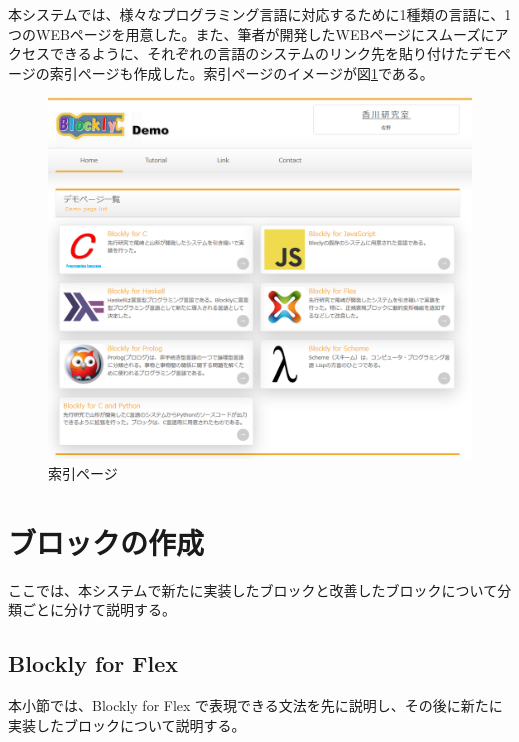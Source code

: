 \documentclass{risepaper}
\begin{document}
本システムでは、様々なプログラミング言語に対応するために1種類の言語に、1つのWEBページを用意した。また、筆者が開発したWEBページにスムーズにアクセスできるように、それぞれの言語のシステムのリンク先を貼り付けたデモページの索引ページも作成した。索引ページのイメージが図\ref{fig:index}である。

\begin{figure}[h]
\begin{center}
\includegraphics[scale=0.5]{img/index.PNG}
\caption{索引ページ}%
\label{fig:index}
\end{center}%
\end{figure}%
   
   \section{ブロックの作成}

ここでは、本システムで新たに実装したブロックと改善したブロックについて分類ごとに分けて説明する。
   

   \subsection{Blockly for Flex}

本小節では、Blockly for Flex で表現できる文法を先に説明し、その後に新たに実装したブロックについて説明する。
\end{document}
